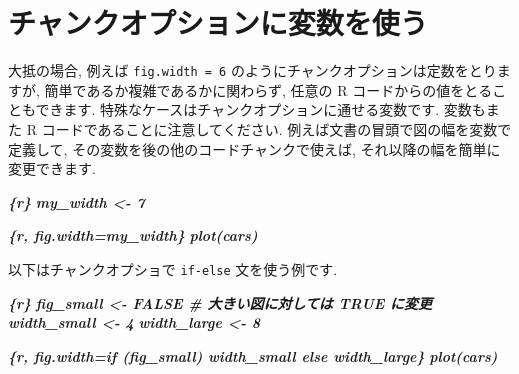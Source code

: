 \documentclass[
  11pt,
  lualatex,
  ja=standard]{bxjsreport}
\newenvironment{Shaded}{\begin{snugshade}}{\end{snugshade}}
\newcommand{\InformationTok}[1]{\textcolor[rgb]{0.56,0.35,0.01}{\textbf{\textit{#1}}}}
\begin{document}
\begin{Shaded}
\end{Shaded}

\hypertarget{chunk-variable}{%
\section{チャンクオプションに変数を使う}\label{chunk-variable}}

大抵の場合, 例えば \texttt{fig.width = 6} のようにチャンクオプションは定数をとりますが, 簡単であるか複雑であるかに関わらず, 任意の R コードからの値をとることもできます. 特殊なケースはチャンクオプションに通せる変数です. 変数もまた R コードであることに注意してください. 例えば文書の冒頭で図の幅を変数で定義して, その変数を後の他のコードチャンクで使えば, それ以降の幅を簡単に変更できます.

\begin{Shaded}
\begin{Highlighting}[]
\InformationTok{\textasciigrave{}\textasciigrave{}\textasciigrave{}\{r\}}
\InformationTok{my\_width \textless{}{-} 7}
\InformationTok{\textasciigrave{}\textasciigrave{}\textasciigrave{}}

\InformationTok{\textasciigrave{}\textasciigrave{}\textasciigrave{}\{r, fig.width=my\_width\}}
\InformationTok{plot(cars)}
\InformationTok{\textasciigrave{}\textasciigrave{}\textasciigrave{}}
\end{Highlighting}
\end{Shaded}

以下はチャンクオプショで \texttt{if-else} 文を使う例です.

\begin{Shaded}
\begin{Highlighting}[]
\InformationTok{\textasciigrave{}\textasciigrave{}\textasciigrave{}\{r\}}
\InformationTok{fig\_small \textless{}{-} FALSE  \# 大きい図に対しては TRUE に変更}
\InformationTok{width\_small \textless{}{-} 4}
\InformationTok{width\_large \textless{}{-} 8}
\InformationTok{\textasciigrave{}\textasciigrave{}\textasciigrave{}}

\InformationTok{\textasciigrave{}\textasciigrave{}\textasciigrave{}\{r, fig.width=if (fig\_small) width\_small else width\_large\}}
\InformationTok{plot(cars)}
\InformationTok{\textasciigrave{}\textasciigrave{}\textasciigrave{}}
\end{Highlighting}
\end{Shaded}
\end{document}
